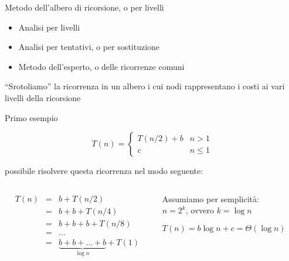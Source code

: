 \begin{frame}{Metodo dell'albero di ricorsione, o per livelli}

\begin{myboxtitle}
\begin{itemize}
\item \alert{Analisi per livelli}
\item Analisi per tentativi, o per sostituzione
\item Metodo dell'esperto, o delle ricorrenze comuni
\end{itemize}
\end{myboxtitle}


\begin{myboxtitle}
“Srotoliamo” la ricorrenza in un albero i cui nodi rappresentano i costi ai vari livelli della ricorsione
\end{myboxtitle}

\end{frame}

\begin{frame}{Primo esempio}

\vspace{-6pt}
\begin{mybox}
\[
T(n) = 
  \begin{cases}
     T(n/2) + b & n > 1 \\
     c & n \leq 1
  \end{cases} 
\]
\end{mybox}

\EE possibile risolvere questa ricorrenza nel modo seguente:

\begin{columns}
\begin{column}{0.54\textwidth}
\begin{eqnarray*}
T(n) &=& b + T(n/2) \\
     &=& b + b + T(n/4) \\
     &=& b + b + b + T(n/8) \\
     &=& \ldots \\
     &=& \underbrace{b + b + \ldots + b }_{\log n}+ T(1)
\end{eqnarray*}

\end{column}
\begin{column}{0.45\textwidth}
\begin{mybox}
Assumiamo per semplicità:\\
$n=2^k$, ovvero $k = \log n$
\end{mybox}	
\begin{mybox}
$T(n) = b \log n + c = \Theta(\log n)$	
\end{mybox}	
\end{column}
\end{columns}


\end{frame}

